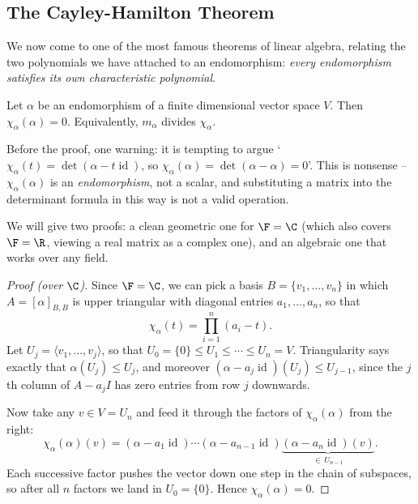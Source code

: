 \subsection{The Cayley-Hamilton Theorem}

We now come to one of the most famous theorems of linear algebra, relating the two polynomials we have attached to an endomorphism: \emph{every endomorphism satisfies its own characteristic polynomial}.

\begin{theorem}
    Let $\alpha$ be an endomorphism of a finite dimensional vector space $V$. Then $\chi_\alpha(\alpha) = 0$. Equivalently, $m_\alpha$ divides $\chi_\alpha$.
\end{theorem}

Before the proof, one warning: it is tempting to argue `$\chi_\alpha(t) = \det (\alpha - t\operatorname{id})$, so $\chi_\alpha(\alpha) = \det(\alpha - \alpha) = 0$'. This is nonsense -- $\chi_\alpha(\alpha)$ is an \emph{endomorphism}, not a scalar, and substituting a matrix into the determinant formula in this way is not a valid operation.

We will give two proofs: a clean geometric one for $\F = \C$ (which also covers $\F = \R$, viewing a real matrix as a complex one), and an algebraic one that works over any field.

\begin{proof}[Proof (over $\C$)]
    Since $\F = \C$, we can pick a basis $B = \{v_1, \dots, v_n\}$ in which $A = [\alpha]_{B,B}$ is upper triangular with diagonal entries $a_1, \dots, a_n$, so that
    $$
    \chi_\alpha(t) = \prod_{i = 1}^n (a_i - t).
    $$
    Let $U_j = \langle v_1, \dots, v_j\rangle$, so that $U_0 = \{0\} \leq U_1 \leq \cdots \leq U_n = V$. Triangularity says exactly that $\alpha(U_j) \leq U_j$, and moreover $(\alpha - a_j \operatorname{id})(U_j) \leq U_{j - 1}$, since the $j$th column of $A - a_j I$ has zero entries from row $j$ downwards.

    Now take any $v \in V = U_n$ and feed it through the factors of $\chi_\alpha(\alpha)$ from the right:
    $$
    \chi_\alpha(\alpha)(v) = (\alpha - a_1 \operatorname{id}) \cdots (\alpha - a_{n-1}\operatorname{id}) \underbrace{(\alpha - a_n \operatorname{id})(v)}_{\in\, U_{n - 1}}.
    $$
    Each successive factor pushes the vector down one step in the chain of subspaces, so after all $n$ factors we land in $U_0 = \{0\}$. Hence $\chi_\alpha(\alpha) = 0$.
\end{proof}

